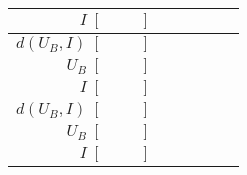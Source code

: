 \documentclass[11pt,a4paper,twoside]{article}
\begin{document}
\begin{table}[!h]
\begin{tabular}{|r|c|c|c|c|c|}
\hline
$I \; [\hspace{1cm}]$ & \hspace{2cm} & \hspace{2cm} & \hspace{2cm} & \hspace{2cm} & \hspace{2cm} \\
\hline
$d(U_B, I) \; [\hspace{1cm}]$ & \hspace{2cm} & \hspace{2cm} & \hspace{2cm} & \hspace{2cm} & \hspace{2cm} \\
\hline
\hline
$U_B \; [\hspace{1cm}]$ & \hspace{2cm} & \hspace{2cm} & \hspace{2cm} & \hspace{2cm} & \hspace{2cm} \\
\hline
$I \; [\hspace{1cm}]$ & \hspace{2cm} & \hspace{2cm} & \hspace{2cm} & \hspace{2cm} & \hspace{2cm} \\
\hline
$d(U_B, I) \; [\hspace{1cm}]$ & \hspace{2cm} & \hspace{2cm} & \hspace{2cm} & \hspace{2cm} & \hspace{2cm} \\
\hline
\hline
$U_B \; [\hspace{1cm}]$ & \hspace{2cm} & \hspace{2cm} & \hspace{2cm} & \hspace{2cm} & \hspace{2cm} \\
\hline
$I \; [\hspace{1cm}]$ & \hspace{2cm} & \hspace{2cm} & \hspace{2cm} & \hspace{2cm} & \hspace{2cm} \\

\end{tabular}
\end{table}
\end{document}
